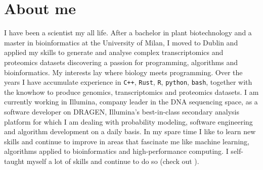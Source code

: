 \section{About me}
I have been a scientist my all life. After a bachelor in plant biotechnology
and a master in bioinformatics at the University of Milan, I moved to Dublin
and applied my skills to generate and analyse complex transcriptomics and
proteomics datasets discovering a passion for programming, algorithms and
bioinformatics. My interests lay where biology meets programming. Over the
years I have accumulate experience in \texttt{C++}, \texttt{Rust}, \texttt{R},
\texttt{python}, \texttt{bash}, together with the knowhow to produce genomics,
transcriptomics and proteomics datasets. I am currently working in Illumina,
company leader in the DNA sequencing space, as a software developer on DRAGEN,
Illumina's best-in-class secondary analysis platform for which I am dealing
with probability modeling, software engineering and algorithm development on a
daily basis. In my spare time I like to learn new skills and continue to
improve in areas that fascinate me like machine learning, algorithms applied
to bioinformatics and high-performance computing. I self-taught myself a lot
of skills and continue to do so (check out \textcolor{blue}{{}}).
